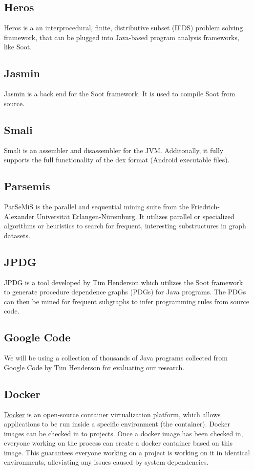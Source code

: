 \documentclass[12pt]{article}
\begin{document}
\subsection{Heros}
Heros is a an interprocedural, finite, distributive subset (IFDS) problem solving framework, that can be plugged into Java-based program analysis frameworks, like Soot.

\subsection{Jasmin}
Jasmin is a back end for the Soot framework. It is used to compile Soot from source.

\subsection{Smali}
Smali is an assembler and disassembler for the JVM. Additonally, it fully supports the full functionality of the dex format (Android executable files).

\subsection{Parsemis}
ParSeMiS is the parallel and sequential mining suite from the Friedrich-Alexander Universit{\"a}t Erlangen-N{\"u}remburg. It utilizes parallel or specialized algorithms or heuristics to search for frequent, interesting substructures in graph datasets.

\subsection{JPDG}
\label{subsection:JPDG}
JPDG is a tool developed by Tim Henderson which utilizes the Soot framework to generate procedure dependence graphs (PDGs) for Java programs. The PDGs can then be mined for frequent subgraphs to infer programming rules from source code.

\subsection{Google Code}
We will be using a collection of thousands of Java programs collected from Google Code by Tim Henderson for evaluating our research.

\subsection{Docker}
\label{subsection:Docker}
\href{http://www.docker.com}{Docker} is an open-source container virtualization platform, which allows applications to be run inside a specific environment (the container). Docker images can be checked in to projects. Once a docker image has been checked in, everyone working on the process can create a docker container based on this image. This guarantees everyone working on a project is working on it in identical environments, alleviating any issues caused by system dependencies.

\pagebreak


\end{document}
